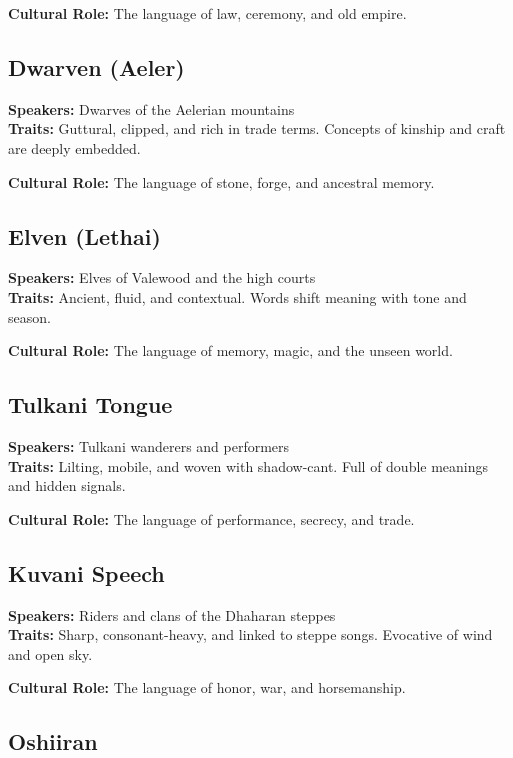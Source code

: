\textbf{Cultural Role:} The language of law, ceremony, and old empire.

\subsection*{Dwarven (Aeler)}

\textbf{Speakers:} Dwarves of the Aelerian mountains \\
\textbf{Traits:} Guttural, clipped, and rich in trade terms. Concepts of kinship and craft are deeply embedded.

\textbf{Cultural Role:} The language of stone, forge, and ancestral memory.

\subsection*{Elven (Lethai)}

\textbf{Speakers:} Elves of Valewood and the high courts \\
\textbf{Traits:} Ancient, fluid, and contextual. Words shift meaning with tone and season.

\textbf{Cultural Role:} The language of memory, magic, and the unseen world.

\subsection*{Tulkani Tongue}

\textbf{Speakers:} Tulkani wanderers and performers \\
\textbf{Traits:} Lilting, mobile, and woven with shadow-cant. Full of double meanings and hidden signals.

\textbf{Cultural Role:} The language of performance, secrecy, and trade.

\subsection*{Kuvani Speech}

\textbf{Speakers:} Riders and clans of the Dhaharan steppes \\
\textbf{Traits:} Sharp, consonant-heavy, and linked to steppe songs. Evocative of wind and open sky.

\textbf{Cultural Role:} The language of honor, war, and horsemanship.

\subsection*{Oshiiran}

